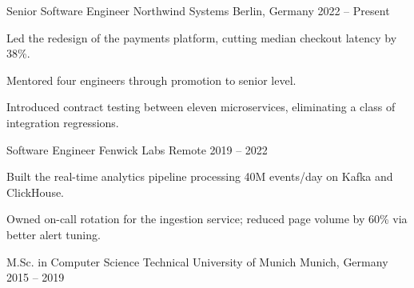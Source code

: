 \documentclass[11pt, a4paper]{awesome-cv}
\begin{document}
\makecvheader


\begin{cventries}
  \cventry
    {Senior Software Engineer}
    {Northwind Systems}
    {Berlin, Germany}
    {2022 -- Present}
    {
      \begin{cvitems}
        \item {Led the redesign of the payments platform, cutting median checkout latency by 38\%.}
        \item {Mentored four engineers through promotion to senior level.}
        \item {Introduced contract testing between eleven microservices, eliminating a class of integration regressions.}
      \end{cvitems}
    }
  \cventry
    {Software Engineer}
    {Fenwick Labs}
    {Remote}
    {2019 -- 2022}
    {
      \begin{cvitems}
        \item {Built the real-time analytics pipeline processing 40M events/day on Kafka and ClickHouse.}
        \item {Owned on-call rotation for the ingestion service; reduced page volume by 60\% via better alert tuning.}
      \end{cvitems}
    }
\end{cventries}


\begin{cventries}
  \cventry
    {M.Sc. in Computer Science}
    {Technical University of Munich}
    {Munich, Germany}
    {2015 -- 2019}
    {}
\end{cventries}


\begin{cvskills}
\end{cvskills}
\end{document}
